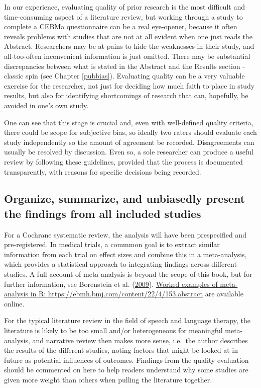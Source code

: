 \documentclass{krantz}
\begin{document}
In our experience, evaluating quality of prior research is the most difficult and time-consuming aspect of a literature review, but working through a study to complete a CEBMa questionnaire can be a real eye-opener, because it often reveals problems with studies that are not at all evident when one just reads the Abstract. Researchers may be at pains to hide the weaknesses in their study, and all-too-often inconvenient information is just omitted. There may be substantial discrepancies between what is stated in the Abstract and the Results section - classic spin (see Chapter \ref{pubbias}). Evaluating quality can be a very valuable exercise for the researcher, not just for deciding how much faith to place in study results, but also for identifying shortcomings of research that can, hopefully, be avoided in one's own study.

One can see that this stage is crucial and, even with well-defined quality criteria, there could be scope for subjective bias, so ideally two raters should evaluate each study independently so the amount of agreement be recorded. Disagreements can usually be resolved by discussion. Even so, a sole researcher can produce a useful review by following these guidelines, provided that the process is documented transparently, with reasons for specific decisions being recorded.

\hypertarget{organize-summarize-and-unbiasedly-present-the-findings-from-all-included-studies}{%
\subsection{Organize, summarize, and unbiasedly present the findings from all included studies}\label{organize-summarize-and-unbiasedly-present-the-findings-from-all-included-studies}}

For a Cochrane systematic review, the analysis will have been prespecified and pre-registered. In medical trials, a commmon goal is to extract similar information from each trial on effect sizes and combine this in a meta-analysis, which provides a statistical approach to integrating findings across different studies. A full account of meta-analysis is beyond the scope of this book, but for further information, see Borenstein et al. (\protect\hyperlink{ref-borenstein2009}{2009}). \href{https://ebmh.bmj.com/content/22/4/153.abstract}{Worked examples of meta-analysis in R: https://ebmh.bmj.com/content/22/4/153.abstract} are available online.

For the typical literature review in the field of speech and language therapy, the literature is likely to be too small and/or heterogeneous for meaningful meta-analysis, and narrative review then makes more sense, i.e.~the author describes the results of the different studies, noting factors that might be looked at in future as potential influences of outcomes. Findings from the quality evaluation should be commented on here to help readers understand why some studies are given more weight than others when pulling the literature together.
\end{document}
